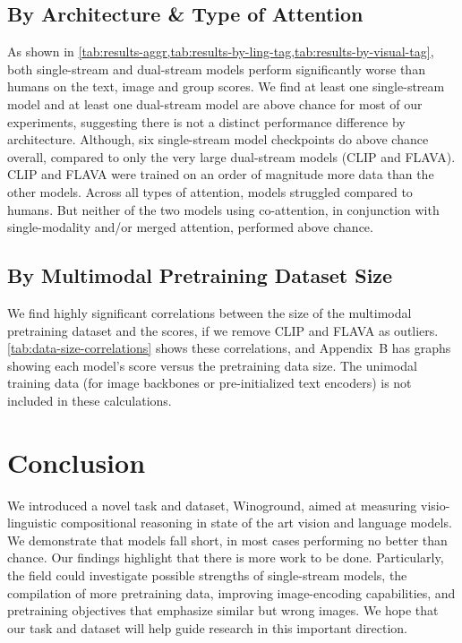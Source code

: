 \documentclass[10pt,twocolumn,letterpaper]{article}
\begin{document}
\subsection{By Architecture \& Type of Attention}

As shown in \cref{tab:results-aggr,tab:results-by-ling-tag,tab:results-by-visual-tag}, both single-stream and dual-stream models perform significantly worse than humans on the text, image and group scores.
We find at least one single-stream model and at least one dual-stream model are above chance for most of our experiments, suggesting there is not a distinct performance difference by architecture. Although, six single-stream model checkpoints do above chance overall, compared to only the very large dual-stream models (CLIP and FLAVA). CLIP and FLAVA were trained on an order of magnitude more data than the other models.
Across all types of attention, models struggled compared to humans.
But neither of the two models using co-attention, in conjunction with single-modality and/or merged attention, performed above chance.

\subsection{By Multimodal Pretraining Dataset Size}

We find highly significant correlations between the size of the multimodal pretraining dataset and the scores, if we remove CLIP and FLAVA as outliers. \cref{tab:data-size-correlations} shows these correlations, and Appendix~B has graphs showing each model's score versus the pretraining data size. The unimodal training data (for image backbones or pre-initialized text encoders) is not included in these calculations.





\section{Conclusion}

We introduced a novel task and dataset, Winoground, aimed at measuring visio-linguistic compositional reasoning in state of the art vision and language models. We demonstrate that models fall short, in most cases performing no better than chance. Our findings highlight that there is more work to be done. Particularly, the field could investigate possible strengths of single-stream models, the compilation of more pretraining data, improving image-encoding capabilities, and pretraining objectives that emphasize similar but wrong images. We hope that our task and dataset will help guide research in this important direction.
\end{document}
